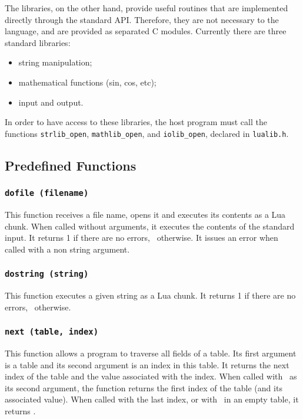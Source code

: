 The libraries, on the other hand, provide useful routines
that are implemented directly through the standard API.
Therefore, they are not necessary to the language,
and are provided as separated C modules.
Currently there are three standard libraries:
\begin{itemize}
\item string manipulation;
\item mathematical functions (sin, cos, etc);
\item input and output.
\end{itemize}
In order to have access to these libraries,
the host program must call the functions
\verb-strlib_open-, \verb-mathlib_open-, and \verb-iolib_open-,
declared in \verb-lualib.h-.


\subsection{Predefined Functions}

\subsubsection*{{\tt dofile (filename)}}
This function receives a file name,
opens it and executes its contents as a Lua chunk.
When called without arguments,
it executes the contents of the standard input.
It returns 1 if there are no errors, \nil\ otherwise.
It issues an error when called with a non string argument.

\subsubsection*{{\tt dostring (string)}}
This function executes a given string as a Lua chunk.
It returns 1 if there are no errors, \nil\ otherwise.

\subsubsection*{{\tt next (table, index)}}
This function allows a program to traverse all fields of a table.
Its first argument is a table and its second argument
is an index in this table.
It returns the next index of the table and the
value associated with the index.
When called with \nil\ as its second argument,
the function returns the first index
of the table (and its associated value).
When called with the last index, or with \nil\ in an empty table,
it returns \nil.

